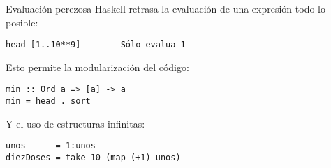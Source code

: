 \begin{frame}[fragile]{Evaluación perezosa}
  Haskell retrasa la evaluación de una expresión todo lo posible:
  \begin{lstlisting}
head [1..10**9]     -- Sólo evalua 1
  \end{lstlisting}

  \espacio

  Esto permite la modularización del código:
  \begin{lstlisting}
min :: Ord a => [a] -> a
min = head . sort
  \end{lstlisting}
\espacio
  Y el uso de estructuras infinitas:
  \begin{lstlisting}
unos      = 1:unos
diezDoses = take 10 (map (+1) unos)
  \end{lstlisting}
\end{frame}
